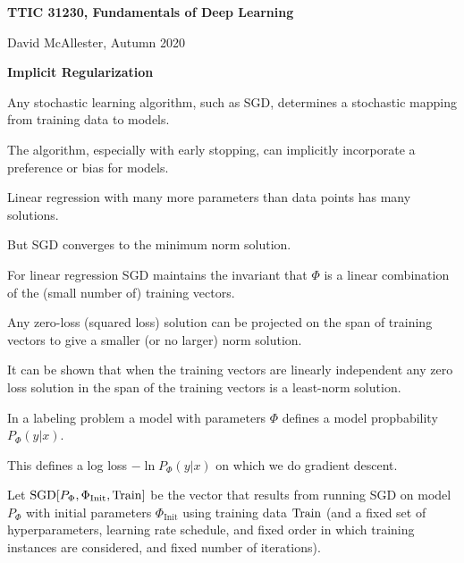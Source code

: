 





{\Huge


\centerline{\bf TTIC 31230, Fundamentals of Deep Learning}
\bigskip
\centerline{David McAllester, Autumn 2020}

\vfill
\centerline{\bf Implicit Regularization}
\vfill
\vfill


Any stochastic learning algorithm, such as SGD, determines a stochastic mapping from training data to models.

\vfill
The algorithm, especially with early stopping, can implicitly incorporate a preference or bias for models.


Linear regression with many more parameters than data points
has many solutions.

\vfill
But SGD converges to the minimum norm solution.


For linear regression SGD maintains the invariant that $\Phi$ is a linear combination of the (small number of) training vectors.

\vfill
Any zero-loss (squared loss) solution can be projected on the span of training vectors to give a smaller (or no larger) norm solution.

\vfill
It can be shown that when the training vectors are linearly independent any zero loss solution in the span of the training vectors is a least-norm solution.


In a labeling problem a model with parameters $\Phi$ defines a model propbability $P_\Phi(y|x)$.

\vfill
This defines a log loss $-\ln P_\Phi(y|x)$ on which we do gradient descent.

\vfill
Let {\color{red} $\mathrm{SGD}\!\left[P_\Phi,\Phi_{\mathrm{Init}},\mathrm{Train}\right]$} be the vector that results from running SGD on model $P_\Phi$ with initial parameters $\Phi_{\mathrm{Init}}$
using training data $\mathrm{Train}$ (and a fixed set of hyperparameters, learning rate schedule, and fixed order in which training instances are considered,
and fixed number of iterations).



}
